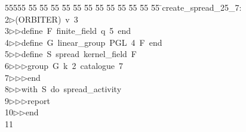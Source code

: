 %
%
\begin{tabbing}
55555 \= 55 \= 55 \= 55 \= 55 \= 55 \= 55 \= 55 \= 55 \= 55 \= 55 \= 55 \= 55 \= \>create\_spread\_25\_7:\\[0pt]
2\>$\triangleright$\>(ORBITER)\ v\ 3\ \\[0pt]
3\>$\triangleright$\>$\triangleright$\>define\ F\ finite\_field\ q\ 5\ end\ \\[0pt]
4\>$\triangleright$\>$\triangleright$\>define\ G\ linear\_group\ PGL\ 4\ F\ end\ \\[0pt]
5\>$\triangleright$\>$\triangleright$\>define\ S\ spread\ kernel\_field\ F\ \\[0pt]
6\>$\triangleright$\>$\triangleright$\>$\triangleright$\>group\ G\ k\ 2\ catalogue\ 7\ \\[0pt]
7\>$\triangleright$\>$\triangleright$\>$\triangleright$\>end\ \\[0pt]
8\>$\triangleright$\>$\triangleright$\>with\ S\ do\ spread\_activity\ \\[0pt]
9\>$\triangleright$\>$\triangleright$\>$\triangleright$\>report\ \\[0pt]
10\>$\triangleright$\>$\triangleright$\>end\\[0pt]
11\>\end{tabbing}

